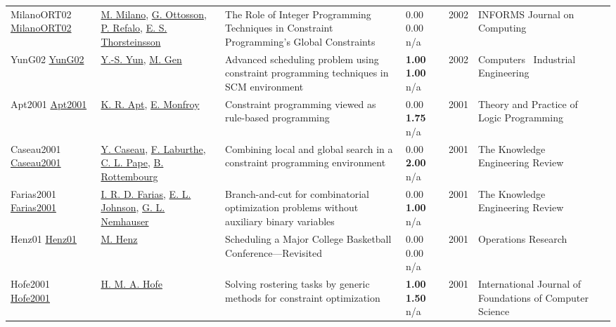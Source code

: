 {\begin{longtable}{p{3cm}p{5cm}p{10cm}p{1cm}rp{2.5cm}l}
MilanoORT02 \href{http://dx.doi.org/10.1287/ijoc.14.4.387.2830}{MilanoORT02} & \hyperref[auth:a143]{M. Milano}, \hyperref[auth:a852]{G. Ottosson}, \hyperref[auth:a254]{P. Refalo}, \hyperref[auth:a874]{E. S. Thorsteinsson} & The Role of Integer Programming Techniques in Constraint Programming's Global Constraints & \noindent{}\textcolor{black!50}{0.00} \textcolor{black!50}{0.00} n/a & 2002 & \cellcolor{red!20}INFORMS Journal on Computing & \cite{MilanoORT02}\\
YunG02 \href{http://dx.doi.org/10.1016/s0360-8352(02)00065-7}{YunG02} & \hyperref[auth:a1472]{Y.-S. Yun}, \hyperref[auth:a1473]{M. Gen} & Advanced scheduling problem using constraint programming techniques in SCM environment & \noindent{}\textbf{1.00} \textbf{1.00} n/a & 2002 & Computers \  Industrial Engineering & \cite{YunG02}\\
Apt2001 \href{http://dx.doi.org/10.1017/s1471068401000072}{Apt2001} & \hyperref[auth:a1887]{K. R. Apt}, \hyperref[auth:a1833]{E. Monfroy} & \cellcolor{green!10}Constraint programming viewed as rule-based programming & \noindent{}\textcolor{black!50}{0.00} \textbf{1.75} n/a & 2001 & Theory and Practice of Logic Programming & \cite{Apt2001}\\
Caseau2001 \href{http://dx.doi.org/10.1017/s0269888901000078}{Caseau2001} & \hyperref[auth:a301]{Y. Caseau}, \hyperref[auth:a1513]{F. Laburthe}, \hyperref[auth:a163]{C. L. Pape}, \hyperref[auth:a1576]{B. Rottembourg} & Combining local and global search in a constraint programming environment & \noindent{}\textcolor{black!50}{0.00} \textbf{2.00} n/a & 2001 & The Knowledge Engineering Review & \cite{Caseau2001}\\
Farias2001 \href{http://dx.doi.org/10.1017/s0269888901000030}{Farias2001} & \hyperref[auth:a1932]{I. R. D. Farias}, \hyperref[auth:a1933]{E. L. Johnson}, \hyperref[auth:a1934]{G. L. Nemhauser} & Branch-and-cut for combinatorial optimization problems without auxiliary binary variables & \noindent{}\textcolor{black!50}{0.00} \textbf{1.00} n/a & 2001 & The Knowledge Engineering Review & \cite{Farias2001}\\
Henz01 \href{http://dx.doi.org/10.1287/opre.49.1.163.11193}{Henz01} & \hyperref[auth:a1419]{M. Henz} & Scheduling a Major College Basketball Conference—Revisited & \noindent{}\textcolor{black!50}{0.00} \textcolor{black!50}{0.00} n/a & 2001 & \cellcolor{red!20}Operations Research & \cite{Henz01}\\
Hofe2001 \href{http://dx.doi.org/10.1142/s0129054101000710}{Hofe2001} & \hyperref[auth:a2012]{H. M. A. Hofe} & Solving rostering tasks by generic methods for constraint optimization & \noindent{}\textbf{1.00} \textbf{1.50} n/a & 2001 & International Journal of Foundations of Computer Science & \cite{Hofe2001}\\

\end{longtable}}
